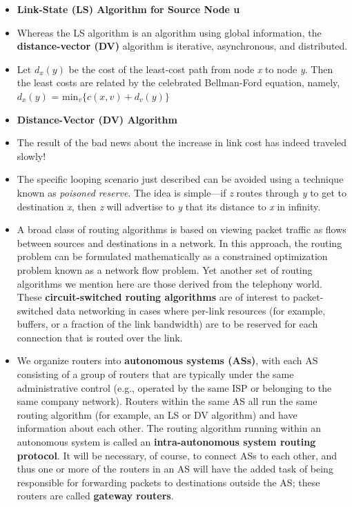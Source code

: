 \begin{itemize}
\item
\textbf{Link-State (LS) Algorithm for Source Node u}

\item
Whereas the LS algorithm is an algorithm using global information, the \textbf{distance-vector (DV)} algorithm is iterative, asynchronous, and distributed.

\item
Let \(d_x(y)\) be the cost of the least-cost path from node \textit{x} to node \textit{y}. Then the least costs are related by the celebrated Bellman-Ford equation, namely,\\
\hspace*{1em}\(d_x(y)\) = min\(_v\)$\{$\(c(x,v)+d_v(y)\)$\}$

\item
\textbf{Distance-Vector (DV) Algorithm}

\item
The result of the bad news about the increase in link cost has indeed traveled slowly!

\item
The specific looping scenario just described can be avoided using a technique known as \textit{poisoned reserve}. The idea is simple---if \textit{z} routes through \textit{y} to get to destination \textit{x}, then \textit{z} will advertise to \textit{y} that its distance to \textit{x} in infinity.

\item
A broad class of routing algorithms is based on viewing packet traffic as flows between sources and destinations in a network. In this approach, the routing problem can be formulated mathematically as a constrained optimization problem known as a network flow problem. Yet another set of routing algorithms we mention here are those derived from the telephony world. These \textbf{circuit-switched routing algorithms} are of interest to packet-switched data networking in cases where per-link resources (for example, buffers, or a fraction of the link bandwidth) are to be reserved for each connection that is routed over the link.

\item
We organize routers into \textbf{autonomous systems (ASs)}, with each AS consisting of a group of routers that are typically under the same administrative control (e.g., operated by the same ISP or belonging to the same company network). Routers within the same AS all run the same routing algorithm (for example, an LS or DV algorithm) and have information about each other. The routing algorithm running within an autonomous system is called an \textbf{intra-autonomous system routing protocol}. It will be necessary, of course, to connect ASs to each other, and thus one or more of the routers in an AS will have the added task of being responsible for forwarding packets to destinations outside the AS; these routers are called \textbf{gateway routers}.


\end{itemize}
